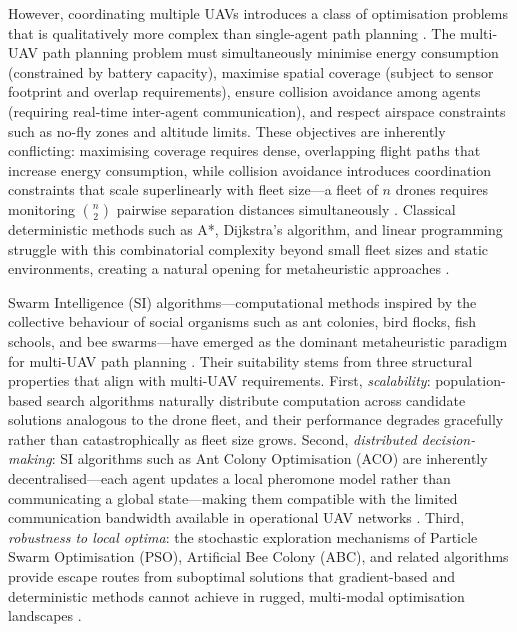 \documentclass[review,3p,times]{elsarticle}
\begin{document}
However, coordinating multiple UAVs introduces a class of optimisation problems that is qualitatively more complex than single-agent path planning \cite{chung2018,gupta2016,bekmezci2013,hayat2016}. The multi-UAV path planning problem must simultaneously minimise energy consumption (constrained by battery capacity), maximise spatial coverage (subject to sensor footprint and overlap requirements), ensure collision avoidance among agents (requiring real-time inter-agent communication), and respect airspace constraints such as no-fly zones and altitude limits. These objectives are inherently conflicting: maximising coverage requires dense, overlapping flight paths that increase energy consumption, while collision avoidance introduces coordination constraints that scale superlinearly with fleet size---a fleet of $n$ drones requires monitoring $\binom{n}{2}$ pairwise separation distances simultaneously \cite{bekmezci2013}. Classical deterministic methods such as A*, Dijkstra's algorithm, and linear programming struggle with this combinatorial complexity beyond small fleet sizes and static environments, creating a natural opening for metaheuristic approaches \cite{aitsaadi2022}.

Swarm Intelligence (SI) algorithms---computational methods inspired by the collective behaviour of social organisms such as ant colonies, bird flocks, fish schools, and bee swarms---have emerged as the dominant metaheuristic paradigm for multi-UAV path planning \cite{dorigo2006,kennedy1995,blum2008,yang2010,beni2005,bonabeau1999,yang2013}. Their suitability stems from three structural properties that align with multi-UAV requirements. First, \textit{scalability}: population-based search algorithms naturally distribute computation across candidate solutions analogous to the drone fleet, and their performance degrades gracefully rather than catastrophically as fleet size grows. Second, \textit{distributed decision-making}: SI algorithms such as Ant Colony Optimisation (ACO) are inherently decentralised---each agent updates a local pheromone model rather than communicating a global state---making them compatible with the limited communication bandwidth available in operational UAV networks \cite{dorigo2006,hayat2016}. Third, \textit{robustness to local optima}: the stochastic exploration mechanisms of Particle Swarm Optimisation (PSO), Artificial Bee Colony (ABC), and related algorithms provide escape routes from suboptimal solutions that gradient-based and deterministic methods cannot achieve in rugged, multi-modal optimisation landscapes \cite{kennedy1995,blum2008}.
\end{document}

